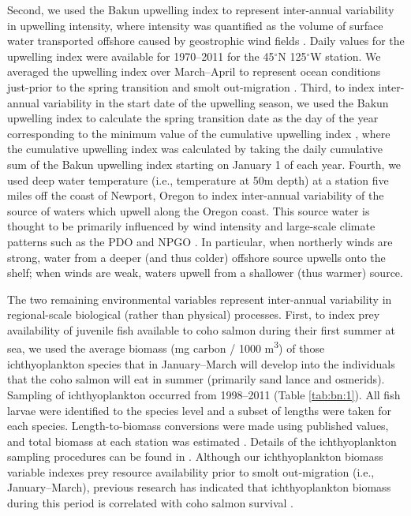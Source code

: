 Second, we used the Bakun upwelling index to represent inter-annual variability
in upwelling intensity, where intensity was quantified as the volume of surface
water transported offshore caused by geostrophic wind fields \citep{Bakun1973,
Schwing1996}. Daily values for the upwelling index were available for 1970--2011
for the 45$^{\circ}$N 125$^{\circ}$W station.  We averaged the upwelling index
over March--April to represent ocean conditions just-prior to the spring
transition and smolt out-migration \citep{Logerwell2003a, Lawson1997}. Third, to
index inter-annual variability in the start date of the upwelling season, we
used the Bakun upwelling index to calculate the spring transition date as the
day of the year corresponding to the minimum value of the cumulative upwelling
index \citep{Bakun1973, Bograd2009}, where the cumulative upwelling index was
calculated by taking the daily cumulative sum of the Bakun upwelling index
starting on January 1 of each year. Fourth, we used deep water temperature
(i.e., temperature at 50m depth) at a station five miles off the coast of
Newport, Oregon to index inter-annual variability of the source of waters which
upwell along the Oregon coast. This source water is thought to be primarily
influenced by wind intensity and large-scale climate patterns such as the PDO
and NPGO \citep{Jacox2014, Chhak2007}. In particular, when northerly winds are
strong, water from a deeper (and thus colder) offshore source upwells onto the
shelf; when winds are weak, waters upwell from a shallower (thus warmer) source.

The two remaining environmental variables represent inter-annual variability in
regional-scale biological (rather than physical) processes. First, to index prey
availability of juvenile fish available to coho salmon during their first summer
at sea, we used the average biomass (mg carbon / 1000 m\textsuperscript{3}) of
those ichthyoplankton species that in January--March will develop into the
individuals that the coho salmon will eat in summer (primarily sand lance and
osmerids).  Sampling of ichthyoplankton occurred from 1998--2011 (Table
\ref{tab:bn:1}). All fish larvae were identified to the species level and a
subset of lengths were taken for each species. Length-to-biomass conversions
were made using published values, and total biomass at each station was
estimated \citep{Peterson2012a}. Details of the ichthyoplankton sampling
procedures can be found in \citet{Daly2013}. Although our ichthyoplankton
biomass variable indexes prey resource availability prior to smolt out-migration
(i.e., January--March), previous research has indicated that ichthyoplankton
biomass during this period is correlated with coho salmon survival
\citep{Daly2013}.

